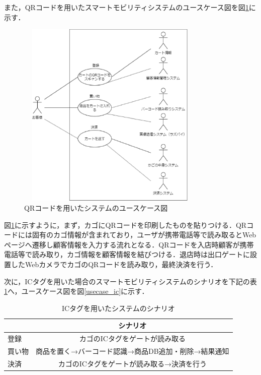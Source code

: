 また，QRコードを用いたスマートモビリティシステムのユースケース図を図\ref{usecase_qr}に示す．

\begin{figure}[htbp]
\centering
\includegraphics[height = 9cm,width = 9cm]{./picture/usecase_qr.eps}
\caption{QRコードを用いたシステムのユースケース図}
\label{usecase_qr}
\end{figure}

図\ref{usecase_qr}に示すように，まず，カゴにQRコードを印刷したものを貼りつける．QRコードには固有のカゴ情報が含まれており，ユーザが携帯電話等で読み取るとWebページへ遷移し顧客情報を入力する流れとなる．QRコードを入店時顧客が携帯電話等で読み取り，カゴ情報を顧客情報を結びつける．退店時は出口ゲートに設置したWebカメラでカゴのQRコードを読み取り，最終決済を行う．


次に，ICタグを用いた場合のスマートモビリティシステムのシナリオを下記の表\ref{sina_ic}へ，ユースケース図を図\ref{usecase_ic}に示す．


\begin{table}[htb]
\begin{center}
\caption{ICタグを用いたシステムのシナリオ}
\begin{tabular}{|l|c|} \hline
 & シナリオ \\ \hline \hline
登録 & カゴのICタグをゲートが読み取る \\
買い物 & 商品を置く→バーコード認識→商品DB追加・削除→結果通知 \\
決済 & カゴのICタグをゲートが読み取る→決済を行う \\ \hline
\end{tabular}
\label{sina_ic}
\end{center}
\end{table}


